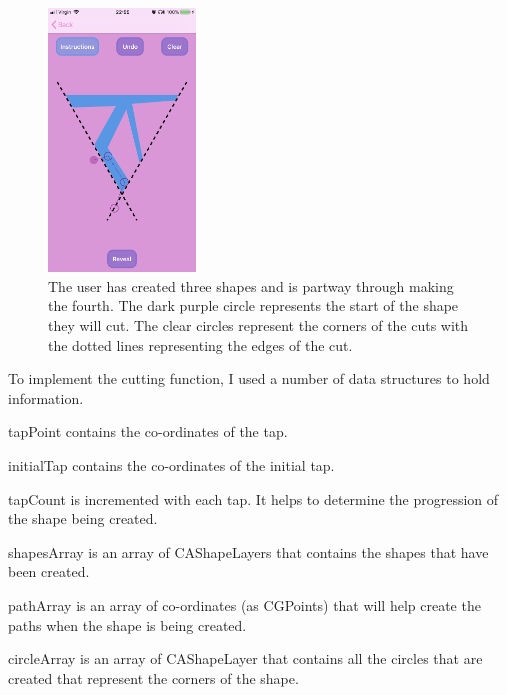 \documentclass[11pt]{article}
\begin{document}
                 \begin{figure}
                        \centering
                        \includegraphics[width=0.35\textwidth]{KiriZen/createPattern.png}
                        \caption{The user has created three shapes and is partway through making the fourth. The dark purple circle represents the start of the shape they will cut. The clear circles represent the corners of the cuts with the dotted lines representing the edges of the cut.}
                        \label{fig:kiriZen-createPattern}
                    \end{figure}
                    
                 To implement the cutting function, I used a number of data structures to hold information. 
                 
                 tapPoint contains the co-ordinates of the tap.
                 
                 initialTap contains the co-ordinates of the initial tap.
                 
                 tapCount is incremented with each tap. It helps to determine the progression of the shape being created.
                 
                 shapesArray is an array of CAShapeLayers that contains the shapes that have been created.
                 
                 pathArray is an array of co-ordinates (as CGPoints) that will help create the paths when the shape is being created.
                
                 circleArray is an array of CAShapeLayer that contains all the circles that are created that represent the corners of the shape.
                
\end{document}

